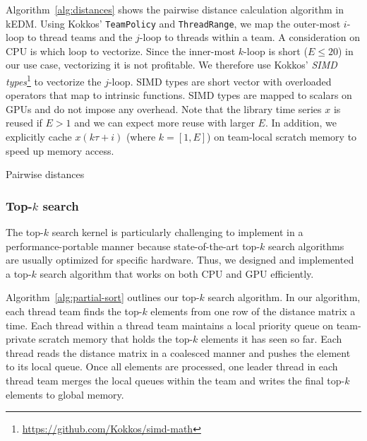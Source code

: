 \documentclass[sigconf]{acmart}
\begin{document}
Algorithm~\ref{alg:distances} shows the pairwise distance calculation
algorithm in kEDM\@. Using Kokkos' \texttt{TeamPolicy} and
\texttt{ThreadRange}, we map the outer-most $i$-loop to thread teams and the $j$-loop to
threads within a team. A consideration on CPU is which loop to vectorize.
Since the inner-most $k$-loop is short ($E \leq 20$) in our use case,
vectorizing it is not profitable. We therefore use Kokkos'
\textit{SIMD types}\footnote{\url{https://github.com/Kokkos/simd-math}} to vectorize the
$j$-loop. SIMD types are short vector with overloaded operators that map to
intrinsic functions. SIMD types are mapped to scalars on GPUs and do not
impose any overhead. Note that the library time series $x$ is reused if $E > 1$
and we can expect more reuse with larger $E$. In addition, we explicitly cache
$x(k \tau + i)$ (where $k=[1, E]$) on team-local scratch
memory to speed up memory access.

\begin{algorithm}
    \SetAlgoLined
    \DontPrintSemicolon
    \caption{Pairwise distances}%
    \label{alg:distances}
\end{algorithm}

\subsubsection{Top-$k$ search}

The top-$k$ search kernel is particularly challenging to implement in a performance-portable manner
because state-of-the-art top-$k$ search algorithms~\cite{Johnson2019,Shanbhag2018}
are usually optimized for specific hardware. Thus, we designed and
implemented a top-$k$ search algorithm that works on both CPU and GPU
efficiently.

Algorithm~\ref{alg:partial-sort} outlines our top-$k$ search algorithm. In our algorithm, each
thread team finds the top-$k$ elements from one row of the distance matrix a
time. Each thread within a thread team maintains a local priority queue on
team-private scratch memory that holds the top-$k$ elements it has seen so far. Each thread
reads the distance matrix in a coalesced manner and pushes the element to its
local queue. Once all elements are processed, one leader thread in each thread team merges
the local queues within the team and writes the final top-$k$ elements to
global memory.
\end{document}
